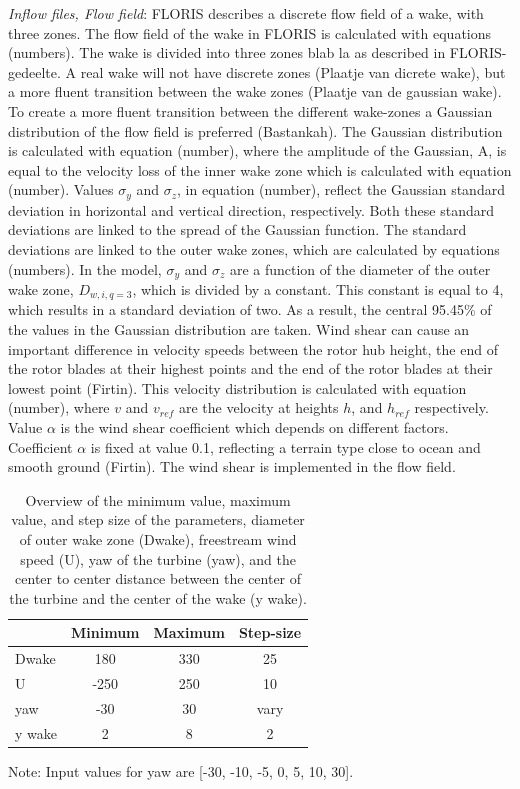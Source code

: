 \documentclass[twoside,twocolumn]{article}
\begin{document}
\textit{Inflow files, Flow field}: FLORIS describes a discrete flow field of a wake, with three zones. The flow field of the wake in FLORIS is calculated with equations (numbers). The wake is divided into three zones blab la as described in FLORIS-gedeelte. A real wake will not have discrete zones (Plaatje van dicrete wake), but a more fluent transition between the wake zones (Plaatje van de gaussian wake). To create a more fluent transition between the different wake-zones a Gaussian distribution of the flow field is preferred (Bastankah). The Gaussian distribution is calculated with equation (number), where the amplitude of the Gaussian, A, is equal to the velocity loss of the inner wake zone which is calculated with equation (number). Values $\sigma_y$ and $\sigma_z$, in equation (number), reflect the Gaussian standard deviation in horizontal and vertical direction, respectively. Both these standard deviations are linked to the spread of the Gaussian function. The standard deviations are linked to the outer wake zones, which are calculated by equations (numbers). In the model, $\sigma_y$ and $\sigma_z$ are a function of the diameter of the outer wake zone,  $D_{w,i,q=3}$, which is divided by a constant. This constant is equal to 4, which results in a standard deviation of two. As a result, the central 95.45\% of the values in the Gaussian distribution are taken. 
Wind shear can cause an important difference in velocity speeds between the rotor hub height, the end of the rotor blades at their highest points and the end of the rotor blades at their lowest point (Firtin). This velocity distribution is calculated with equation (number), where $v$ and $v_{ref}$ are the velocity at heights $h$, and $h_{ref}$  respectively. Value $\alpha$ is the wind shear coefficient which depends on different factors. Coefficient $\alpha$ is fixed at value 0.1, reflecting a terrain type close to ocean and smooth ground (Firtin). The wind shear is implemented in the flow field.


\begin{table}[h]
	\caption{Overview of the minimum value, maximum value, and step size of the parameters, diameter of outer wake zone (Dwake), freestream wind speed (U), yaw of the turbine (yaw), and the center to center distance between the center of the turbine and the center of the wake (y wake).}
	\centering
	\label{tab:pars}
	\begin{tabular}{lccc}
	\hline
	 & Minimum & Maximum & Step-size \\ 
	\hline
	Dwake & 180 & 330 & 25 \\
	U & -250 & 250 & 10 \\
	yaw & -30 & 30 & vary \\
	y wake & 2 & 8 & 2 \\
	\hline
	\end{tabular}

Note: Input values for yaw are [-30, -10, -5, 0, 5, 10, 30].
\end{table}
\end{document}
